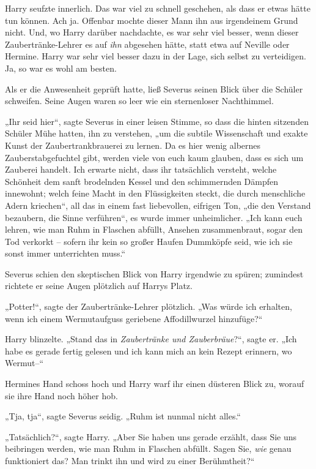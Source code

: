 Harry seufzte innerlich. Das war viel zu schnell geschehen, als dass er etwas hätte tun können. Ach ja. Offenbar mochte dieser Mann ihn aus irgendeinem Grund nicht. Und, wo Harry darüber nachdachte, es war sehr viel besser, wenn dieser Zaubertränke-Lehrer es auf \emph{ihn} abgesehen hätte, statt etwa auf Neville oder Hermine. Harry war sehr viel besser dazu in der Lage, sich selbst zu verteidigen. Ja, so war es wohl am besten. 

Als er die Anwesenheit geprüft hatte, ließ Severus seinen Blick über die Schüler schweifen. Seine Augen waren so leer wie ein sternenloser Nachthimmel. 

„Ihr seid hier“, sagte Severus in einer leisen Stimme, so dass die hinten sitzenden Schüler Mühe hatten, ihn zu verstehen, „um die subtile Wissenschaft und exakte Kunst der Zaubertrankbrauerei zu lernen. Da es hier wenig albernes Zauberstabgefuchtel gibt, werden viele von euch kaum glauben, dass es sich um Zauberei handelt. Ich erwarte nicht, dass ihr tatsächlich versteht, welche Schönheit dem sanft brodelnden Kessel und den schimmernden Dämpfen innewohnt; welch feine Macht in den Flüssigkeiten steckt, die durch menschliche Adern kriechen“, all das in einem fast liebevollen, eifrigen Ton, „die den Verstand bezaubern, die Sinne verführen“, es wurde immer unheimlicher. „Ich kann euch lehren, wie man Ruhm in Flaschen abfüllt, Ansehen zusammenbraut, sogar den Tod verkorkt – sofern ihr kein so großer Haufen Dummköpfe seid, wie ich sie sonst immer unterrichten muss.“ 

Severus schien den skeptischen Blick von Harry irgendwie zu spüren; zumindest richtete er seine Augen plötzlich auf Harrys Platz. 

„Potter!“, sagte der Zaubertränke-Lehrer plötzlich. „Was würde ich erhalten, wenn ich einem Wermutaufguss geriebene Affodillwurzel hinzufüge?“ 

Harry blinzelte. „Stand das in \emph{Zaubertränke und Zauberbräue}?“, sagte er. „Ich habe es gerade fertig gelesen und ich kann mich an kein Rezept erinnern, wo Wermut–“ 

Hermines Hand schoss hoch und Harry warf ihr einen düsteren Blick zu, worauf sie ihre Hand noch höher hob. 

„Tja, tja“, sagte Severus seidig. „Ruhm ist nunmal nicht alles.“ 

„Tatsächlich?“, sagte Harry. „Aber Sie haben uns gerade erzählt, dass Sie uns beibringen werden, wie man Ruhm in Flaschen abfüllt. Sagen Sie, \emph{wie} genau funktioniert das? Man trinkt ihn und wird zu einer Berühmtheit?“ 

